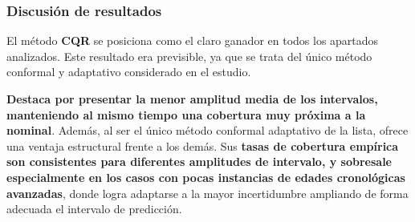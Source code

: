 

    



\subsubsection{Discusión de resultados}

El método \textbf{\acrshort{CQR}} se posiciona como el claro ganador en todos los apartados analizados. Este resultado era previsible, ya que se trata del único método conformal y adaptativo considerado en el estudio.

\textbf{Destaca por presentar la menor amplitud media de los intervalos, manteniendo al mismo tiempo una cobertura muy próxima a la nominal}. Además, al ser el único método conformal adaptativo de la lista, ofrece una ventaja estructural frente a los demás. Sus \textbf{tasas de cobertura empírica son consistentes para diferentes amplitudes de intervalo, y sobresale especialmente en los casos con pocas instancias de edades cronológicas avanzadas}, donde logra adaptarse a la mayor incertidumbre ampliando de forma adecuada el intervalo de predicción.


